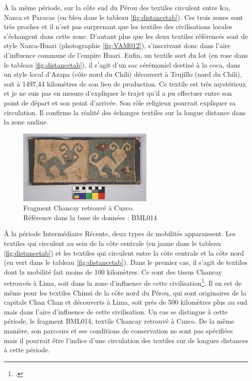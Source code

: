 \noindent À la même période, sur la côte sud du Pérou des textiles circulent entre Ica, Nazca et Paracas (en bleu dans le tableau \ref{fig:distancetab}). Ces trois zones sont très proches et il n'est pas surprenant que les textiles des civilisations locales s'échangent dans cette zone. D'autant plus que les deux textiles référencés sont de style Nazca-Huari (photographie \ref{fig:VAM012}), s'inscrivant donc dans l'aire d'influence commune de l'empire Huari.
Enfin, un textile sort du lot (en rose dans le tableau \ref{fig:distancetab}), il s'agit d'un sac cérémoniel destiné à la coca, dans un style local d'Azapa (côte nord du Chili) découvert à Trujillo (nord du Chili), soit à 1497,44 kilomètres de son lieu de production. Ce textile est très mystérieux et je ne suis pas en mesure d'expliquer le trajet qu'il a pu effectuer entre son point de départ et son point d'arrivée. Son rôle religieux pourrait expliquer sa circulation. Il confirme la réalité des échanges textiles sur la longue distance dans la zone andine.

\begin{figure}
    \centering
    \includegraphics[width=0.6\textwidth]{../images/BML014.jpg}
    \caption{Fragment Chancay retrouvé à Cuzco. \\ Référence dans la base de données : BML014}
    \label{fig:BML014}
\end{figure}

À la période Intermédiaire Récente, deux types de mobilités apparaissent. Les textiles qui circulent au sein de la côte centrale (en jaune dans le tableau \ref{fig:distancetab}) et les textiles qui circulent entre la côte centrale et la côte nord (en vert dans le tableau \ref{fig:distancetab}). Dans le premier cas, il s'agit de textiles dont la mobilité fait moins de 100 kilomètres. Ce sont des tissus Chancay retrouvés à Lima, soit dans la zone d'influence de cette civilisation\footcite[p.~72]{boissiereAtlasAmeriquePrecolombienne2022}.%
Il en est de même pour les textiles Chimú de la côte nord du Pérou, qui sont originaires de la capitale Chan Chan et découverts à Lima, soit près de 500 kilomètres plus au sud mais dans l'aire d'influence de cette civilisation.
Un cas se distingue à cette période, le fragment BML014, textile Chancay retrouvé à Cuzco. De la même manière, son parcours et ses conditions de conservation ne sont pas spécifiées mais il pourrait être l'indice d'une circulation des textiles sur de longues distances à cette période.

